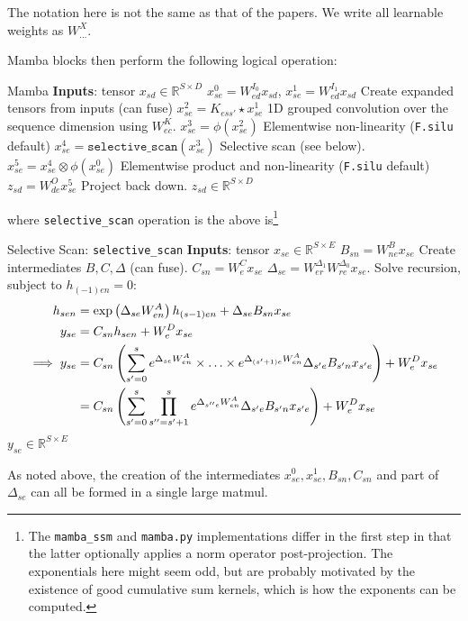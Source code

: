 The notation here is not the same as that of the papers. We write all learnable weights as $ W ^{ X }_{ \ldots  } $.


Mamba blocks then perform the following logical operation:
\begin{algo}{Mamba}
\State \textbf{Inputs}: tensor $ x _{ sd }\in \mathbb{R}^{ S\times D } $
\State $ x ^{ 0 } _{ se } = W ^{ I _{ 0 } }_{ ed } x _{ sd }$, $ x ^{ 1 }  _{ se } = W ^{ I _{ 1 } }_{ ed } x _{ sd } $ \Comment Create expanded tensors from inputs (can fuse)
\State $ x ^{ 2 } _{ se } = K _{ ess' }\star x ^{ 1 }_{ se }$ \Comment 1D grouped convolution over the sequence dimension using $ W ^{ K }_{ ec } $.
\State $ x ^{ 3 } _{ se } = \phi \left ( x ^{ 2 }_{ se } \right )$ \Comment Elementwise non-linearity (\texttt{F.silu} default)
\State $ x ^{ 4 } _{ se } = \texttt{selective\_scan} \left ( x ^{ 3 }_{ se } \right )$ \Comment Selective scan (see below).
\State $ x ^{ 5 } _{ se } = x ^{ 4 } _{ se }\otimes\phi \left ( x ^{ 0 }_{ se } \right )$ \Comment Elementwise product and non-linearity (\texttt{F.silu} default)
\State $ z _{ sd } = W ^{ O }_{ de }x ^{ 5 }_{ se }$ \Comment Project back down.
\State \Return $ z _{ sd } \in \mathbb{R}^{ S\times D }$
\label{algo_mamba_1}
\end{algo}

where \texttt{selective\_scan} operation is the above is\footnote{The \texttt{mamba\_ssm} and
\texttt{mamba.py} implementations differ in the first step in that the latter optionally applies a
norm operator post-projection. The exponentials here might seem odd, but are probably motivated by
the existence of good cumulative sum kernels, which is how the exponents can be computed.}

\begin{algo}{Selective Scan: \texttt{selective\_scan} }
\State \textbf{Inputs}: tensor $ x _{ se }\in \mathbb{R}^{ S\times E } $
\State $ B _{ sn } = W ^{ B }_{ ne }x _{ se } $  \Comment Create intermediates $B, C, \Delta  $ (can
fuse).
\State $ C _{ sn } = W ^{ C }_{ e }x _{ se } $
\State $ \Delta  _{ se } = W ^{ \Delta  _{ 1 } }_{ er } W ^{ \Delta _{ 0 } } _{ re } x _{ se } $.
\State Solve recursion, subject to $ h _{ (-1)en }=0 $:
\begin{align}
    h _{ sen } &= \exp \left ( \Delta  _{ se } W^{A} _{ en } \right ) h _{ (s-1)e n} + \Delta _{ se }B _{ sn }x _{ se }\nonumber\\
    y _{ se } &= C _{ sn }h _{ sen } + W ^{ D } _{ e }x _{ se } \nonumber\\
    \implies y _{ se } &= C _{ sn }\left (\sum _{ s'=0 }^{ s }e^{ \Delta _{ se }W^{A} _{ en } }\times \ldots \times e^{ \Delta _{ (s'+1)e }W^{A} _{ en } } \Delta _{ s'e } B _{ s'n } x _{ s'e }\right ) + W ^{ D } _{ e } x _{ se }\nonumber\\
     &= C _{ sn }\left (\sum _{ s'=0 }^{ s }\prod_{ s''=s'+1 }^{ s }e^{ \Delta _{ s''e }W^{A} _{ en } } \Delta _{ s'e } B _{ s'n } x _{ s'e }\right ) + W ^{ D } _{ e } x _{ se }
\end{align}
\State \Return $ y _{ se } \in \mathbb{R}^{ S\times E }$
\label{algo_mamba1_scan}
\end{algo}
As noted above, the creation of the intermediates $ x ^{ 0 }_{ se }, x ^{ 1 }_{ se }, B _{ sn }, C
_{ sn } $ and part of $ \Delta  _{ se } $ can all be formed in a single large matmul.

